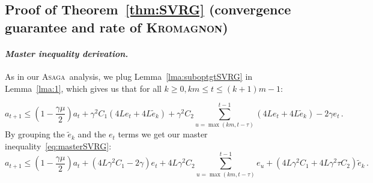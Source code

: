 \documentclass[twoside, 11pt]{article}
\newcommand{\stepsize}{\gamma}
\newcommand{\strongconvex}{\mu}
\newcommand{\overlap}{\tau}
\newcommand{\lipschitz}{L}
\newcommand{\ASAGA}{\textsc{Asaga}}
\newcommand{\KROMAGNON}{\textsc{Kromagnon}}
\begin{document}
\subsection{Proof of Theorem~\ref{thm:SVRG} (convergence guarantee and rate of \KROMAGNON)}
\paragraph{\textit{Master inequality derivation.}}\label{apx:SVRGmaster}
As in our \ASAGA\ analysis, we plug Lemma~\ref{lma:suboptgtSVRG} in Lemma~\ref{lma:1}, which gives us that for all $k \geq 0, km\leq  t \leq (k+1)m -1$:

\begin{equation}
a_{t+1}
\leq (1 - \frac{\stepsize\strongconvex}{2})a_t
+ \stepsize^2 C_1 (4\lipschitz e_t + 4 \lipschitz \tilde e_k)
+ \stepsize^2 C_2 \sum_{u = \max(km, t - \overlap)}^{t-1} (4\lipschitz e_t + 4 \lipschitz \tilde e_k)
- 2\stepsize e_t \,.
\end{equation}
By grouping the $\tilde e_k$ and the $e_t$ terms we get our master inequality~\eqref{eq:masterSVRG}:
\begin{equation*}
a_{t+1}
\leq (1 - \frac{\stepsize\strongconvex}{2})a_t
+ (4\lipschitz \stepsize^2 C_1 -2\stepsize) e_t
+ 4\lipschitz \stepsize^2 C_2 \sum_{u = \max(km, t-\overlap)}^{t-1} e_u
+ (4\lipschitz \stepsize^2 C_1 + 4 \lipschitz \stepsize^2\overlap C_2) \tilde e_k \,.
\end{equation*}
\end{document}
